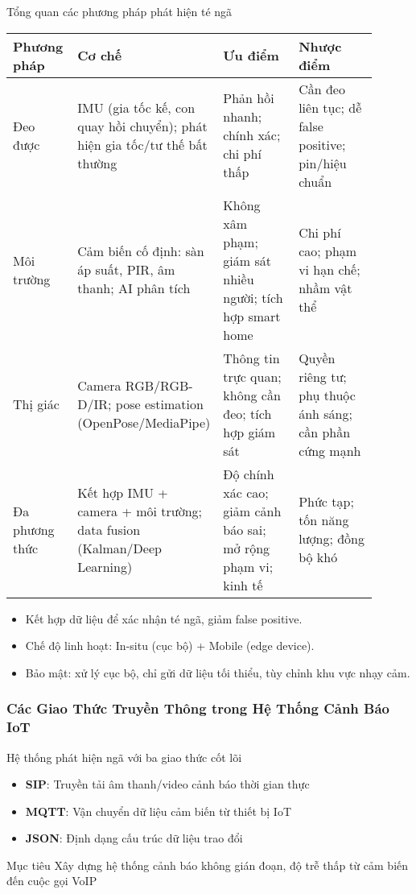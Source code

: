 \begin{frame}{Tổng quan các phương pháp phát hiện té ngã}
\scriptsize
\begin{tabular}{|p{0.18\linewidth}|p{0.22\linewidth}|p{0.25\linewidth}|p{0.25\linewidth}|}
\hline
\textbf{Phương pháp} & \textbf{Cơ chế} & \textbf{Ưu điểm} & \textbf{Nhược điểm} \\
\hline
Đeo được & IMU (gia tốc kế, con quay hồi chuyển); phát hiện gia tốc/tư thế bất thường & Phản hồi nhanh; chính xác; chi phí thấp & Cần đeo liên tục; dễ false positive; pin/hiệu chuẩn \\
\hline
Môi trường & Cảm biến cố định: sàn áp suất, PIR, âm thanh; AI phân tích & Không xâm phạm; giám sát nhiều người; tích hợp smart home & Chi phí cao; phạm vi hạn chế; nhầm vật thể \\
\hline
Thị giác & Camera RGB/RGB-D/IR; pose estimation (OpenPose/MediaPipe) & Thông tin trực quan; không cần đeo; tích hợp giám sát & Quyền riêng tư; phụ thuộc ánh sáng; cần phần cứng mạnh \\
\hline
Đa phương thức & Kết hợp IMU + camera + môi trường; data fusion (Kalman/Deep Learning) & Độ chính xác cao; giảm cảnh báo sai; mở rộng phạm vi; kinh tế & Phức tạp; tốn năng lượng; đồng bộ khó \\
\hline
\end{tabular}

\vspace{0.3em}
\begin{itemize}\scriptsize
    \item Kết hợp dữ liệu để xác nhận té ngã, giảm false positive.  
    \item Chế độ linh hoạt: In-situ (cục bộ) + Mobile (edge device).  
    \item Bảo mật: xử lý cục bộ, chỉ gửi dữ liệu tối thiểu, tùy chỉnh khu vực nhạy cảm.
\end{itemize}
\end{frame}
\begin{frame}
\frametitle{Các Giao Thức Truyền Thông trong Hệ Thống Cảnh Báo IoT}
\begin{center}
\Large Hệ thống phát hiện ngã với ba giao thức cốt lõi
\end{center}

\begin{itemize}
\item \textbf{SIP}: Truyền tải âm thanh/video cảnh báo thời gian thực
\item \textbf{MQTT}: Vận chuyển dữ liệu cảm biến từ thiết bị IoT  
\item \textbf{JSON}: Định dạng cấu trúc dữ liệu trao đổi
\end{itemize}

\begin{block}{Mục tiêu}
Xây dựng hệ thống cảnh báo không gián đoạn, độ trễ thấp từ cảm biến đến cuộc gọi VoIP
\end{block}
\end{frame}

